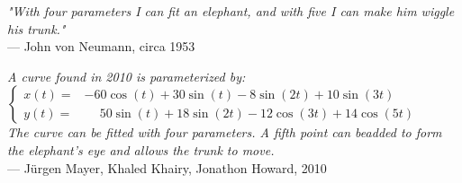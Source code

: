 \begin{flushright}
\emph{"With four parameters I can fit an elephant, and with five I can make him wiggle his trunk."}\\
— John von Neumann, circa 1953
\end{flushright}

\vspace{1.5em}


\vspace{0.5em}

\begin{flushright}
\emph{A curve found in 2010 is parameterized by:}\\[1ex]
$\left\lbrace
\begin{array}{rl}
x(t) = & -60 \cos(t) + 30 \sin(t) - 8 \sin(2t) + 10 \sin(3t) \\
y(t) = & \phantom{-}50 \sin(t) + 18 \sin(2t) - 12 \cos(3t) + 14 \cos(5t)
\end{array}
\right.$
\\[1ex]
\emph{The curve can be fitted with four parameters. A fifth point can beadded to form the elephant's eye and allows the trunk to move.}
\\
— Jürgen Mayer, Khaled Khairy, Jonathon Howard, 2010
\end{flushright}

